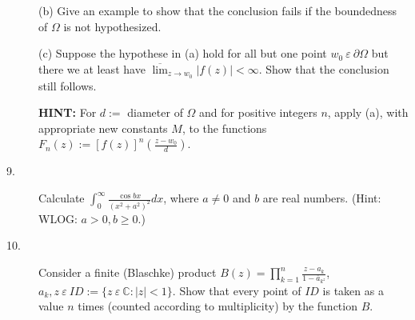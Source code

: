 \documentclass{article}
\def\C{\mathbb C}
\begin{document}
\begin{description}
\item[\quad] (b)
Give an example to show that the conclusion fails if the boundedness of
$\Omega$ is not hypothesized.

\item[\quad] (c)
Suppose the hypothese in (a) hold for all but one point
$w_0 \ \varepsilon \ \partial \Omega$ but there we at least have
$\overline{\lim}_{z \to w_0} |f(z)| < \infty$. Show that the conclusion
still follows.

{\bf HINT:} For $d :=$ diameter of $\Omega$ and for positive integers $n$,
apply (a), with appropriate new constants $M$, to the functions
$F_n (z) := [f(z)]^n \left(\frac{z-w_0}{d}\right)$.

\item[9.]
Calculate $\int^\infty_0 \frac{\cos bx}{(x^2 + a^2)^2} dx$,
where $a \neq 0$ and $b$ are real numbers. (Hint: WLOG: $a>0, b \geq 0$.)

\item[10.]
Consider a finite (Blaschke) product
$B(z) = \prod^n_{k=1} \frac{z-a_k}{1-\overline a_{k^z}}$,
$a_k, z \ \varepsilon \ ID := \{z \ \varepsilon \ \C : |z| < 1\}$. Show
that every point of $ID$ is taken as a value $n$ times (counted according to
multiplicity) by the function $B$.




\end{description}    
\end{document}
